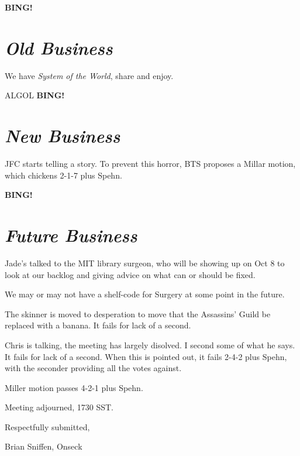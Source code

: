 \documentclass[10pt]{article}
\newcommand{\bing}{{\bf BING!} }
\newcommand{\goto}[1]{\bing \vskip 12pt \section*{{\em{#1}}}}
\newcommand{\ps}{ plus Spehn\xspace}
\begin{document}
\goto{Old Business}
We have \emph{System of the World}, share and enjoy.

ALGOL
\goto{New Business}
JFC starts telling a story.  To prevent this horror, BTS proposes a
Millar motion, which chickens 2-1-7\ps.

\goto{Future Business}
Jade's talked to the MIT library surgeon, who will be showing up on
Oct 8 to look at our backlog and giving advice on what can or should
be fixed.

We may or may not have a shelf-code for Surgery at some point in the
future.

The skinner is moved to desperation to move that the Assassins' Guild
be replaced with a banana.  It fails for lack of a second.

Chris is talking, the meeting has largely disolved.  I second some of
what he says.  It fails for lack of a second.  When this is pointed
out, it fails 2-4-2\ps, with the seconder providing all the votes against.

Miller motion passes 4-2-1\ps.

\vspace{12pt}

\noindent
Meeting adjourned, 1730 SST.

\vspace{18pt}

\centerline{Respectfully submitted,}
\centerline{Brian Sniffen, Onseck}
\end{document}
